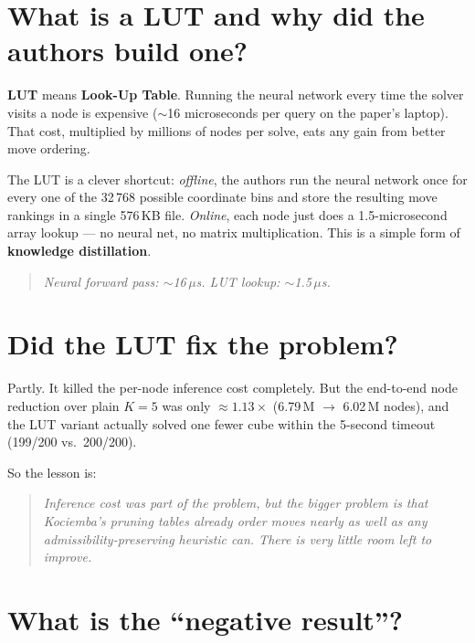 \documentclass[11pt,a4paper]{article}
\newcommand{\defn}[1]{\textbf{#1}}
\newcommand{\qbox}[1]{\begin{quote}\small\textit{#1}\end{quote}}
\begin{document}
\section{What is a LUT and why did the authors build one?}

\defn{LUT} means \textbf{Look-Up Table}. Running the neural network
every time the solver visits a node is expensive ($\sim$16 microseconds
per query on the paper's laptop). That cost, multiplied by millions of
nodes per solve, eats any gain from better move ordering.

The LUT is a clever shortcut: \emph{offline}, the authors run the
neural network once for every one of the 32\,768 possible coordinate
bins and store the resulting move rankings in a single 576\,KB file.
\emph{Online}, each node just does a 1.5-microsecond array lookup ---
no neural net, no matrix multiplication. This is a simple form of
\textbf{knowledge distillation}.

\qbox{Neural forward pass: $\sim$16\,$\mu$s. \quad LUT lookup:
$\sim$1.5\,$\mu$s.}

\section{Did the LUT fix the problem?}

Partly. It killed the per-node inference cost completely. But the
end-to-end node reduction over plain $K=5$ was only $\approx 1.13\times$
(6.79\,M $\to$ 6.02\,M nodes), and the LUT variant actually solved one
fewer cube within the 5-second timeout (199/200 vs.\ 200/200).

So the lesson is:

\qbox{Inference cost was part of the problem, but the bigger problem is
that Kociemba's pruning tables already order moves nearly as well as
any admissibility-preserving heuristic can. There is very little room
left to improve.}

\section{What is the ``negative result''?}
\end{document}
